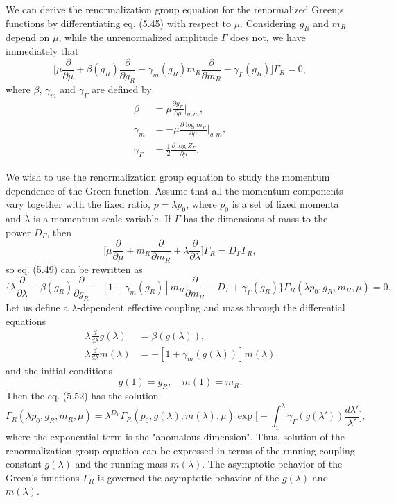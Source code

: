 We can derive the renormalization group equation for the renormalized Green;s functions by differentiating eq. (5.45) with respect to $\mu$. Considering $g_R$ and $m_R$ depend on $\mu$, while the unrenormalized amplitude $\Gamma$ does not, we have immediately that
\begin{equation}
\biggl[ \mu\frac{\partial}{\partial\mu}+\beta(g_R)\frac{\partial}{\partial g_R}-\gamma_m(g_R) m_R\frac{\partial}{\partial m_R}-\gamma_\Gamma(g_R) \biggr]\Gamma_R=0,
\end{equation}
where $\beta$, $\gamma_m$ and $\gamma_\Gamma$ are defined by
\begin{align}
\beta&=\mu\frac{\partial g_R}{\partial \mu}\bigg|_{g,m},\nonumber\\
\gamma_m&=-\mu\frac{\partial\log m_R}{\partial\mu}\bigg|_{g,m},\nonumber\\
\gamma_\Gamma&=\frac{1}{2}\frac{\partial \log Z_\Gamma}{\partial\mu}.
\end{align}

We wish to use the renormalization group equation to study the momentum dependence of the Green function. Assume that all the momentum components vary together with the fixed ratio, $p=\lambda p_0$, where $p_0$ is a set of fixed momenta and $\lambda$ is a momentum scale variable. If $\Gamma$ has the dimensions of mass to the power $D_\Gamma$, then
\begin{equation}
\biggl[ \mu\frac{\partial}{\partial\mu}+m_R\frac{\partial}{\partial m_R}+\lambda\frac{\partial}{\partial\lambda} \biggr]\Gamma_R=D_\Gamma\Gamma_R,
\end{equation}
so eq. (5.49) can be rewritten as 
\begin{equation}
\biggl\{ \lambda\frac{\partial}{\partial\lambda}-\beta(g_R)\frac{\partial}{\partial g_R}-[1+\gamma_m(g_R)] m_R\frac{\partial}{\partial m_R}-D_\Gamma+\gamma_\Gamma(g_R)\biggr\} \Gamma_R(\lambda p_0,g_R,m_R,\mu)=0.
\end{equation}
Let us define a $\lambda$-dependent effective coupling and mass through the differential equations
\begin{align}
\lambda\frac{d}{d\lambda}g(\lambda)&=\beta(g(\lambda)),\\
\lambda\frac{d}{d\lambda}m(\lambda)&=-[1+\gamma_m(g(\lambda))]m(\lambda)
\end{align}
and the initial conditions
\begin{equation}
g(1)=g_R,\quad m(1)=m_R.
\end{equation}
Then the eq. (5.52) has the solution
\begin{equation}
\Gamma_R(\lambda p_0,g_R,m_R,\mu)=\lambda^{D_\Gamma}\Gamma_R(p_0,g(\lambda),m(\lambda),\mu)\exp\biggl[ -\int_1^\lambda\gamma_\Gamma(g(\lambda'))\frac{d\lambda'}{\lambda'} \biggr],
\end{equation}
where the exponential term is the "anomalous dimension". Thus, solution of the renormalization group equation can be expressed in terms of the running coupling constant $g(\lambda)$ and the running mass $m(\lambda)$. The asymptotic behavior of the Green's functions $\Gamma_R$ is governed the asymptotic behavior of the $g(\lambda)$ and $m(\lambda)$. 

